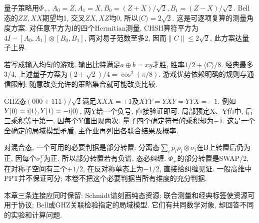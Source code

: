 量子策略用$\Phi_+$, $A_0=Z,A_1=X,B_0=(Z+X)/\sqrt2,B_1=(Z-X)/\sqrt2$. Bell态的$ZZ,XX$期望均1, 交叉$ZX,XZ$均0, 所以$\langle C\rangle=2\sqrt2$. 这是可逐项复算的测量角度方案. 对任意平方为I的四个Hermitian测量, CHSH算符平方为$4I-[A_0,A_1]\otimes[B_0,B_1]$, 两对易子范数至多2, 因而$\|C\|\le2\sqrt2$, 此方案达量子上界.

若写成输入均匀的游戏, 输出比特满足$a\oplus b=xy$才胜, 胜率$1/2+\langle C\rangle/8$. 经典最多3/4, 上述量子方案为$(2+\sqrt2)/4=\cos^2(\pi/8)$. 游戏优势依赖明确的规则与通信限制; 随意改变允许的策略集合就可能改变比较.

GHZ态$(000+111)/\sqrt2$满足$XXX=+1$及$XYY=YXY=YYX=-1$. 例如$Y\lvert 0\rangle=\mathrm i\lvert 1\rangle,Y\lvert 1\rangle=-\mathrm i\lvert 0\rangle$, 两Y给一个负号, 直接验证即可. 局部预定X、Y值中, 后三乘积等于第一, 因每个Y值出现两次. 量子四个确定符号的乘积却为$-1$. 这是一个全确定的局域模型矛盾, 主作业再列出各联合结果及概率.

对混合态, 一个可用的必要判据是部分转置: 分离态$\sum_ip_i\rho_i\otimes\sigma_i$在B上转置后仍为正, 因每个$\sigma_i^T$为正. 所以部分转置若有负谱, 态必纠缠. $\Phi_+$的部分转置是SWAP/2, 在对称子空间有三个$+1/2$, 在反对称单态上为$-1/2$, 直接给纠缠见证. 一般高维中PPT并不保证可分; 本卷不把这个必要判据当所有维度的充分判据.

本章三条连接应同时保留: Schmidt谱刻画纯态资源; 联合测量和经典标签使资源可用于协议; Bell或GHZ关联检验指定的局域模型. 它们有共同数学对象, 却回答不同的实验和计算问题.

